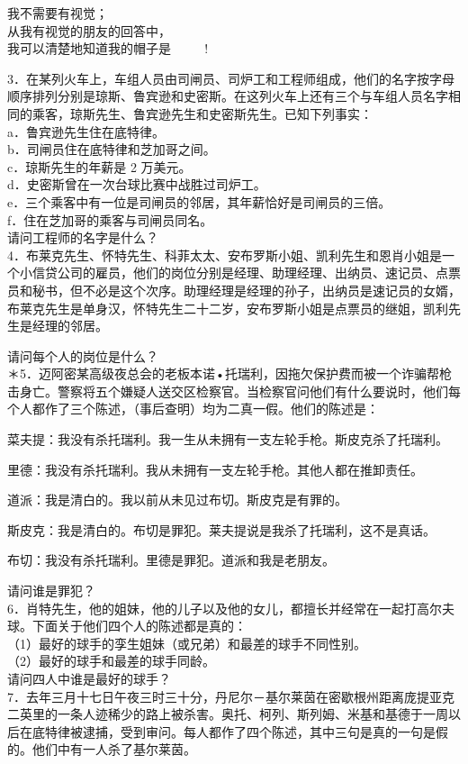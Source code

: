 我不需要有视觉；\\
从我有视觉的朋友的回答中，\\
我可以清楚地知道我的帽子是 $\qquad$ $!$

3．在某列火车上，车组人员由司闸员、司炉工和工程师组成，他们的名字按字母顺序排列分别是琼斯、鲁宾逊和史密斯。在这列火车上还有三个与车组人员名字相同的乘客，琼斯先生、鲁宾逊先生和史密斯先生。已知下列事实：\\
a．鲁宾逊先生住在底特律。\\
b．司闸员住在底特律和芝加哥之间。\\
c．琼斯先生的年薪是 2 万美元。\\
d．史密斯曾在一次台球比赛中战胜过司炉工。\\
e．三个乘客中有一位是司闸员的邻居，其年薪恰好是司闸员的三倍。\\
f．住在芝加哥的乘客与司闸员同名。\\
请问工程师的名字是什么？\\
4．布莱克先生、怀特先生、科菲太太、安布罗斯小姐、凯利先生和恩肖小姐是一个小信贷公司的雇员，他们的岗位分别是经理、助理经理、出纳员、速记员、点票员和秘书，但不必是这个次序。助理经理是经理的孙子，出纳员是速记员的女婿，布莱克先生是单身汉，怀特先生二十二岁，安布罗斯小姐是点票员的继姐，凯利先生是经理的邻居。

请问每个人的岗位是什么？\\
＊5．迈阿密某高级夜总会的老板本诺•托瑞利，因拖欠保护费而被一个诈骗帮枪击身亡。警察将五个嫌疑人送交区检察官。当检察官问他们有什么要说时，他们每个人都作了三个陈述，（事后查明）均为二真一假。他们的陈述是：

菜夫提：我没有杀托瑞利。我一生从未拥有一支左轮手枪。斯皮克杀了托瑞利。

里德：我没有杀托瑞利。我从未拥有一支左轮手枪。其他人都在推卸责任。

道派：我是清白的。我以前从未见过布切。斯皮克是有罪的。

斯皮克：我是清白的。布切是罪犯。莱夫提说是我杀了托瑞利，这不是真话。

布切：我没有杀托瑞利。里德是罪犯。道派和我是老朋友。

请问谁是罪犯？\\
6．肖特先生，他的姐妹，他的儿子以及他的女儿，都擅长并经常在一起打高尔夫球。下面关于他们四个人的陈述都是真的：\\
（1）最好的球手的孪生姐妹（或兄弟）和最差的球手不同性别。\\
（2）最好的球手和最差的球手同龄。\\
请问四人中谁是最好的球手？\\
7．去年三月十七日午夜三时三十分，丹尼尔－基尔莱茵在密歇根州距离庞提亚克二英里的一条人迹稀少的路上被杀害。奥托、柯列、斯列姆、米基和基德于一周以后在底特律被逮捕，受到审问。每人都作了四个陈述，其中三句是真的一句是假的。他们中有一人杀了基尔莱茵。

